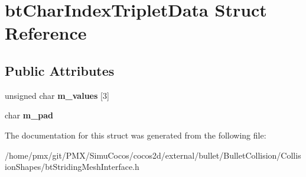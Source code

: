 \hypertarget{structbtCharIndexTripletData}{}\section{bt\+Char\+Index\+Triplet\+Data Struct Reference}
\label{structbtCharIndexTripletData}
\subsection*{Public Attributes}
\begin{DoxyCompactItemize}
\item 
\mbox{\label{structbtCharIndexTripletData_a7e98eea3e2ad8572197d96b9adea297f}} 
unsigned char {\bfseries m\+\_\+values} \mbox{[}3\mbox{]}
\item 
\mbox{\label{structbtCharIndexTripletData_a0da9daf74158d7dd7a2cd3f90ecd978c}} 
char {\bfseries m\+\_\+pad}
\end{DoxyCompactItemize}


The documentation for this struct was generated from the following file\+:\begin{DoxyCompactItemize}
\item 
/home/pmx/git/\+P\+M\+X/\+Simu\+Cocos/cocos2d/external/bullet/\+Bullet\+Collision/\+Collision\+Shapes/bt\+Striding\+Mesh\+Interface.\+h\end{DoxyCompactItemize}
